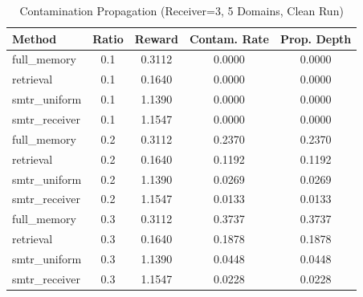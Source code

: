 \begin{table}[t]
\caption{Contamination Propagation (Receiver=3, 5 Domains, Clean Run)}
\label{tab:final_receiver3_contamination}
\centering
\begin{tabular}{l c c c c}
\toprule
Method & Ratio & Reward & Contam. Rate & Prop. Depth \\
\midrule
full\_memory & 0.1 & 0.3112 & 0.0000 & 0.0000 \\
retrieval & 0.1 & 0.1640 & 0.0000 & 0.0000 \\
smtr\_uniform & 0.1 & 1.1390 & 0.0000 & 0.0000 \\
smtr\_receiver & 0.1 & 1.1547 & 0.0000 & 0.0000 \\
\midrule
full\_memory & 0.2 & 0.3112 & 0.2370 & 0.2370 \\
retrieval & 0.2 & 0.1640 & 0.1192 & 0.1192 \\
smtr\_uniform & 0.2 & 1.1390 & 0.0269 & 0.0269 \\
smtr\_receiver & 0.2 & 1.1547 & 0.0133 & 0.0133 \\
\midrule
full\_memory & 0.3 & 0.3112 & 0.3737 & 0.3737 \\
retrieval & 0.3 & 0.1640 & 0.1878 & 0.1878 \\
smtr\_uniform & 0.3 & 1.1390 & 0.0448 & 0.0448 \\
smtr\_receiver & 0.3 & 1.1547 & 0.0228 & 0.0228 \\
\bottomrule
\end{tabular}
\end{table}

